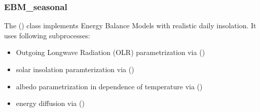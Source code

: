\documentclass[a4paper,10pt,english]{sphinxmanual}
\begin{document}
\subsubsection{EBM\_seasonal}
\label{models:ebm-seasonal}
The {\hyperref[api/climlab.model:climlab.model.ebm.EBM_seasonal]{\emph{}}} () class implements Energy Balance Models with realistic daily insolation.
It uses following subprocesses:
\begin{itemize}
\item {} 
Outgoing Longwave Radiation (OLR) parametrization via
{\hyperref[api/climlab.radiation:climlab.radiation.AplusBT.AplusBT]{\emph{}}} ()

\item {} 
solar insolation paramterization via
{\hyperref[api/climlab.radiation:climlab.radiation.insolation.DailyInsolation]{\emph{}}} ()

\item {} 
albedo parametrization in dependence of temperature via
{\hyperref[api/climlab.surface:climlab.surface.albedo.StepFunctionAlbedo]{\emph{}}} ()

\item {} 
energy diffusion via
{\hyperref[api/climlab.dynamics:climlab.dynamics.diffusion.MeridionalDiffusion]{\emph{}}} ()

\end{itemize}
\end{document}
